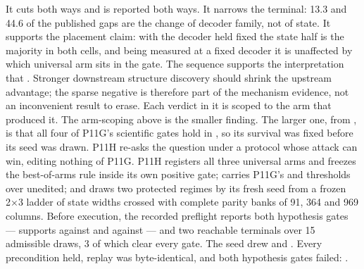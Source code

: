 {}It cuts both ways and is reported both ways. It narrows the terminal: 13.3\markdownRendererPercentSign{} and 44.6\markdownRendererPercentSign{} of the published gaps are the change of decoder family, not of state. It supports the placement claim: with the decoder held fixed the state half is the majority in both cells, and being measured at a fixed decoder it is unaffected by which universal arm sits in the gate.\markdownRendererInterblockSeparator
{}The sequence supports the interpretation that . Stronger downstream structure discovery should shrink the upstream advantage; the sparse negative is therefore part of the mechanism evidence, not an inconvenient result to erase. Each verdict in it is scoped to the arm that produced it.\markdownRendererInterblockSeparator
{}
\markdownRendererSectionEnd \markdownRendererSectionBegin
{}\markdownRendererInterblockSeparator
{}The arm-scoping above is the smaller finding. The larger one, from , is that all four of P11G's scientific gates hold in , so its survival was fixed before its seed was drawn. P11H re-asks the question under a protocol whose attack can win, editing nothing of P11G.\markdownRendererInterblockSeparator
{}P11H registers all three universal arms and freezes the best-of-arms rule inside its own positive gate; carries P11G's  and  thresholds over unedited; and draws two protected regimes by its fresh seed from a frozen 2×3 ladder of state widths  crossed with complete parity banks of 91, 364 and 969 columns. Before execution, the recorded preflight reports both hypothesis gates  — supports \markdownRendererCodeSpan{[0.8808, 1.0000]} against  and \markdownRendererCodeSpan{[0.0000, 0.2482]} against  — and two reachable terminals over 15 admissible draws, 3 of which clear every gate.\markdownRendererInterblockSeparator
{}The seed drew  and . Every precondition held, replay was byte-identical, and both hypothesis gates failed: .\markdownRendererInterblockSeparator
